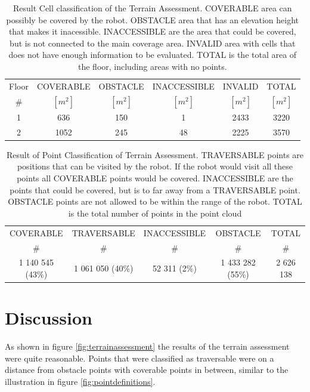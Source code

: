 \begin{table}[]
\caption{Result Cell classification of the Terrain Assessment. COVERABLE area can possibly be covered by the robot. OBSTACLE area that has an elevation height that makes it inacessible. INACCESSIBLE are the area that could be covered, but is not connected to the main coverage area. INVALID area with cells that does not have enough information to be evaluated. TOTAL is the total area of the floor, including areas with no points. }

\begin{center}
\begin{tabular}{ |c|c|c|c|c|c| } 
\hline
Floor & COVERABLE & OBSTACLE & INACCESSIBLE & INVALID & TOTAL \\ 
 \# & $[m^2]$ & $[m^2]$  & $[m^2]$  & $[m^2]$  & $[m^2]$  \\ 
\hline
1 & 636 & 150 & 1 & 2433 & 3220 \\
2 & 1052 & 245 & 48 & 2225 & 3570\\
\hline

\end{tabular}
\end{center}
\label{tab:cellclasses}
\end{table}

\begin{table}[]
\caption{Result of Point Classification of Terrain Assessment. TRAVERSABLE points are positions that can be visited by the robot. If the robot would visit all these points all COVERABLE points would be covered. INACCESSIBLE are the points that could be covered, but is to far away from a TRAVERSABLE point. OBSTACLE points are not allowed to be within the range of the robot. TOTAL is the total number of points in the point cloud}
\begin{center}
\begin{tabular}{ |c|c|c|c|c| } 
\hline
COVERABLE & TRAVERSABLE & INACCESSIBLE & OBSTACLE & TOTAL \\ 
 \# & \# & \#  & \#  & \#  \\ 
\hline
1 140 545 (43\%) & 1 061 050 (40\%) & 52 311 (2\%) & 1 433 282 (55\%) & 2 626 138  \\
\hline

\end{tabular}
\end{center}
\label{tab:pointclasses}
\end{table}

\section{Discussion}
As shown in figure \ref{fig:terrainassessment} the results of the terrain assessment were quite reasonable. Points that were classified as traversable were on a distance from obstacle points with coverable points in between, similar to the illustration in figure \ref{fig:pointdefinitions}. 

